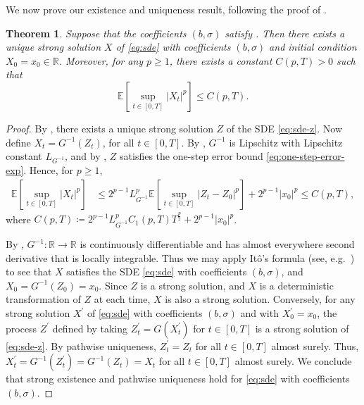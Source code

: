\documentclass[onseside, final]{amsart}
\newtheorem{theorem}{Theorem}[section]
\theoremstyle{definition}
\newcommand{\R}{\mathbb R}
\newcommand{\E}{\mathbb E}
\numberwithin{equation}{section}
\begin{document}
		We now prove our existence and uniqueness result, following the proof of \citep[Theorem 2.6]{LeSz17}.
		
		\begin{theorem}\label{thm:existence-uniqueness}
			Suppose that the coefficients $(b, \sigma)$ satisfy . Then there exists a unique strong solution $X$ of \eqref{eq:sde} with coefficients $(b, \sigma)$ and initial condition $X_0 = x_0 \in \R$. Moreover, for any $p \geq 1$, there exists a constant $C(p, T) > 0$ such that
			\begin{equation}\label{eq:moment-bounds}
				\E\!\left[\sup_{t \in [0, T]}|X_t|^p\right]\! \leq C(p, T).
			\end{equation}
		\end{theorem}
		
		\begin{proof}
			By , there exists a unique strong solution $Z$ of the SDE \eqref{eq:sde-z}. Now define $X_t = G^{-1}(Z_t)$, for all $t \in [0, T]$.
			By , $G^{-1}$ is Lipschitz with Lipschitz constant $L_{G^{-1}}$, and by , $Z$ satisfies the one-step error bound \eqref{eq:one-step-error-exp}. Hence, for $p \geq 1$,
			\begin{equation}
				\begin{split}
					\E\!\left[\sup_{t \in [0, T]}|X_t|^p\right]\!
					& \leq 2^{p - 1}L_{G^{-1}}^p\E\!\left[\sup_{t \in [0, T]}|Z_t - Z_0|^p\right]\! + 2^{p - 1}|x_0|^p \leq C(p,T),
				\end{split}
			\end{equation}
			where $C(p, T) \coloneqq 2^{p - 1}L_{G^{-1}}^pC_1(p, T)T^{\frac p 2} + 2^{p - 1}|x_0|^p$.
			
			By , $G^{-1}\colon \R \to \R$ is continuously differentiable and has almost everywhere second derivative that is locally integrable. Thus we may apply It\^o's formula (see, e.g.~\cite[\S VI~Theorem 1.5 and Remarks]{ReYo99}) to see that $X$ satisfies the SDE \eqref{eq:sde} with coefficients $(b, \sigma)$, and $X_0 = G^{-1}(Z_0) = x_0$. Since $Z$ is a strong solution, and $X$ is a deterministic transformation of $Z$ at each time, $X$ is also a strong solution. Conversely, for any strong solution $X^\prime$ of \eqref{eq:sde} with coefficients $(b, \sigma)$ and with $X^\prime_0 = x_0$, the process $Z^\prime$ defined by taking $Z^\prime_t = G(X^\prime_t)$ for $t \in [0, T]$ is a strong solution of \eqref{eq:sde-z}. By pathwise uniqueness, $Z^\prime_t = Z_t$ for all $t \in [0, T]$ almost surely. Thus, $X^\prime_t = G^{-1}(Z^\prime_t) = G^{-1}(Z_t) = X_t$ for all $t \in [0, T]$ almost surely. We conclude that strong existence and pathwise uniqueness hold for \eqref{eq:sde} with coefficients $(b, \sigma)$.
		\end{proof}
		
\end{document}
